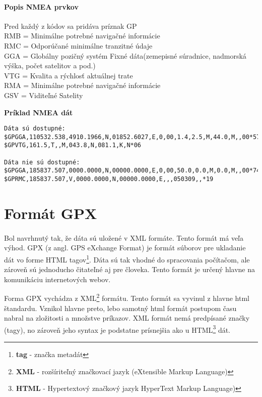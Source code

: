 \paragraph{Popis NMEA prvkov}
Pred každý z kódov sa pridáva príznak GP\\
RMB  = Minimálne potrebné navigačné informácie\\
RMC  = Odporúčané minimálne tranzitné údaje \\
GGA  = Globálny pozičný systém Fixné dáta(zemepisné súradnice, nadmorská výška, počet satelitov a pod.)\\
VTG  = Kvalita a rýchlosť aktuálnej trate\\
RMA  = Minimálne potrebné navigačné informácie\\
GSV  =  Viditeľné Satelity\\
\begin{center}
 \textbf{Príklad NMEA dát}
\begin{verbatim}
Dáta sú dostupné:
$GPGGA,110532.538,4910.1966,N,01852.6027,E,0,00,1.4,2.5,M,44.0,M,,00*57
$GPVTG,161.5,T,,M,043.8,N,081.1,K,N*06

Dáta nie sú dostupné:
$GPGGA,185837.507,0000.0000,N,00000.0000,E,0,00,50.0,0.0,M,0.0,M,,00*74
$GPRMC,185837.507,V,0000.0000,N,00000.0000,E,,,050309,,*19
\end{verbatim}
\end{center}

\section{Formát GPX}
\paragraph{}
Bol navrhnutý tak, že dáta sú uložené v XML formáte. Tento formát má veľa
výhod. GPX (z angl. GPS eXchange Format) je formát súborov pre ukladanie dát vo forme HTML tagov\footnote{\textbf{tag} - značka metadát}. Dáta sú tak vhodné do spracovania počítačom, ale zároveň sú jednoducho čitateľné aj pre človeka. Tento formát je určený hlavne na komunikáciu internetových webov. 

Forma GPX vychádza z XML\footnote{\textbf{XML} - rozšíriteľný značkovací jazyk (eXtensible Markup Language)} formátu. Tento formát sa vyvinul z hlavne html štandardu. Vznikol hlavne preto, lebo samotný html formát postupom času nabral na zložitosti a množstve príkazov. XML formát nemá predpísané značky (tagy), no zároveň jeho syntax je podstatne prísnejšia ako u HTML\footnote{\textbf{HTML} - Hypertextový značkový jazyk HyperText Markup Language)} dát.
